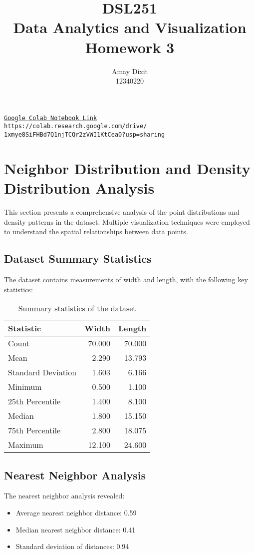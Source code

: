 \documentclass[12pt]{article}
\title{DSL251 \\ Data Analytics and Visualization \\ Homework 3}
\author{Amay Dixit \\ 12340220}
\date{}
\begin{document}
\maketitle

\begin{center}
\href{https://colab.research.google.com/drive/1xmye8SiFHBd7Q1njTCQr2zVWI1KtCea0?usp=sharing}{\texttt{Google Colab Notebook Link}} \\
\texttt{https://colab.research.google.com/drive/\\1xmye8SiFHBd7Q1njTCQr2zVWI1KtCea0?usp=sharing}
\end{center}

\section{Neighbor Distribution and Density Distribution Analysis}

This section presents a comprehensive analysis of the point distributions and density patterns in the dataset. Multiple visualization techniques were employed to understand the spatial relationships between data points.

\subsection{Dataset Summary Statistics}
The dataset contains measurements of width and length, with the following key statistics:

\begin{table}[H]
\centering
\begin{tabular}{lrr}
\toprule
Statistic & Width & Length \\
\midrule
Count & 70.000 & 70.000 \\
Mean & 2.290 & 13.793 \\
Standard Deviation & 1.603 & 6.166 \\
Minimum & 0.500 & 1.100 \\
25th Percentile & 1.400 & 8.100 \\
Median & 1.800 & 15.150 \\
75th Percentile & 2.800 & 18.075 \\
Maximum & 12.100 & 24.600 \\
\bottomrule
\end{tabular}
\caption{Summary statistics of the dataset}
\end{table}

\subsection{Nearest Neighbor Analysis}
The nearest neighbor analysis revealed:
\begin{itemize}
    \item Average nearest neighbor distance: 0.59
    \item Median nearest neighbor distance: 0.41
    \item Standard deviation of distances: 0.94
\end{itemize}
\end{document}
